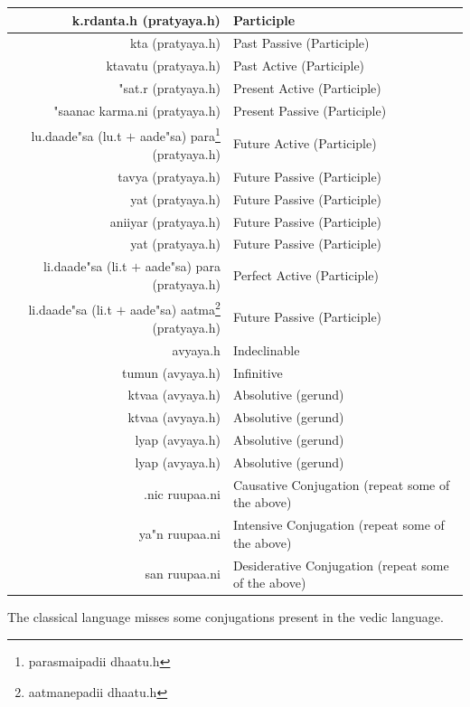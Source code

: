 \documentclass[a4paper, 12pt]{article}
\newcommand \sans[1]{
    \textsanskrit{#1}
}
\begin{document}
\begin{table}[h!]
\begin{center}
\begin{longtable}{|r|l|}
    \hline
    \sans{k.rdanta.h (pratyaya.h)} &
    Participle\\
    \hline
    \sans{kta (pratyaya.h)} &
    Past Passive (Participle)\\
    \hline
    \sans{ktavatu (pratyaya.h)} &
    Past Active (Participle)\\
    \hline
    \sans{"sat.r (pratyaya.h)} &
    Present Active (Participle)\\
    \hline
    \sans{"saanac karma.ni (pratyaya.h)} &
    Present Passive (Participle)\\
    \hline
    \sans{lu.daade"sa (lu.t $+$ aade"sa) para\footnote{\sans{parasmaipadii dhaatu.h}} (pratyaya.h)} &
    Future Active (Participle)\\
    \hline
    \sans{tavya (pratyaya.h)} &
    Future Passive (Participle)\\
    \hline
    \sans{yat (pratyaya.h)} &
    Future Passive (Participle)\\
    \hline
    \sans{aniiyar (pratyaya.h)} &
    Future Passive (Participle)\\
    \hline
    \sans{yat (pratyaya.h)} &
    Future Passive (Participle)\\
    \hline
    \sans{li.daade"sa (li.t $+$ aade"sa) para (pratyaya.h)} &
    Perfect Active (Participle)\\
    \hline
    \sans{li.daade"sa (li.t $+$ aade"sa) aatma\footnote{\sans{aatmanepadii dhaatu.h}} (pratyaya.h)} &
    Future Passive (Participle)\\
    \hline
    \sans{avyaya.h} &
    Indeclinable\\
    \hline
    \sans{tumun (avyaya.h)} &
    Infinitive\\
    \hline
    \sans{ktvaa (avyaya.h)} &
    Absolutive (gerund)\\
    \hline
    \sans{ktvaa (avyaya.h)} &
    Absolutive (gerund)\\
    \hline
    \sans{lyap (avyaya.h)} &
    Absolutive (gerund)\\
    \hline
    \sans{lyap (avyaya.h)} &
    Absolutive (gerund)\\
    \hline
    \sans{.nic ruupaa.ni} &
    Causative Conjugation (repeat some of the above)\\
    \hline
    \sans{ya"n ruupaa.ni} &
    Intensive Conjugation (repeat some of the above)\\
    \hline
    \sans{san ruupaa.ni} &
    Desiderative Conjugation (repeat some of the above)\\
    \hline
\end{longtable}
\end{center}
\end{table}

The classical language misses some conjugations present in the vedic language.
\end{document}
